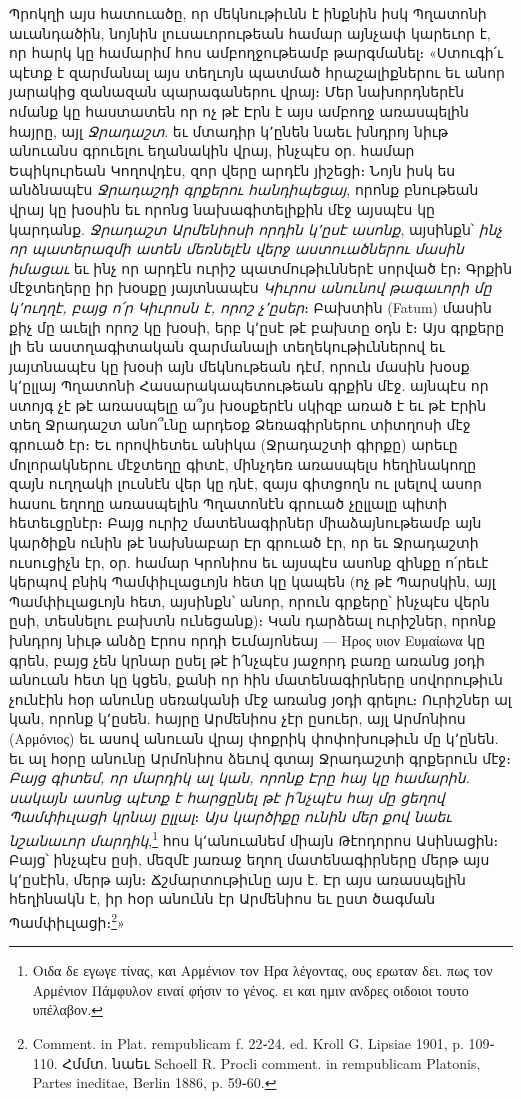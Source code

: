 \documentclass{article}
\begin{document}
{Պրոկղի այս հատուածը, որ մեկնութիւնն է ինքնին իսկ Պղատոնի աւանդածին, նոյնին լուսաւորութեան համար այնչափ կարեւոր է, որ հարկ կը համարիմ հոս ամբողջութեամբ թարգմանել։ «Ստուգի՛ւ պէտք է զարմանալ այս տեղւոյն պատմած հրաշալիքներու եւ անոր յարակից զանազան պարագաներու վրայ։ Մեր նախորդներէն ոմանք կը հաստատեն որ ոչ թէ Էրն է այս ամբողջ առասպելին հայրը, այլ \emph{Ջրադաշտ}. եւ մտադիր կ՚ընեն նաեւ խնդրոյ նիւթ անուանս գրուելու եղանակին վրայ, ինչպէս օր. համար Եպիկուրեան Կողովդէս, զոր վերը արդէն յիշեցի։ Նոյն իսկ ես անձնապէս \emph{Ջրադաշդի գրքերու հանդիպեցայ}, որոնք բնութեան վրայ կը խօսին եւ որոնց նախագիտելիքին մէջ այսպէս կը կարդանք. \emph{Ջրադաշտ Արմենիոսի որդին կ՚ըսէ ասոնք}, այսինքն՝ \emph{ինչ որ պատերազմի ատեն մեռնելէն վերջ աստուածներու մասին իմացաւ} եւ ինչ որ արդէն ուրիշ պատմութիւններէ սորված էր։ Գրքին մէջտեղերը իր խօսքը յայտնապէս \emph{Կիւրոս անունով թագաւորի մը կ՚ուղղէ, բայց ո՛ր Կիւրոսն է, որոշ չ՚ըսեր}։ Բախտին (Fatum) մասին քիչ մը աւելի որոշ կը խօսի, երբ կ՚ըսէ թէ բախտը օդն է։ Այս գրքերը լի են աստղագիտական զարմանալի տեղեկութիւններով եւ յայտնապէս կը խօսի այն մեկնութեան դէմ, որուն մասին խօսք կ՚ըլլայ Պղատոնի Հասարակապետութեան գրքին մէջ. այնպէս որ ստոյգ չէ թէ առասպելը ա՞յս խօսքերէն սկիզբ առած է եւ թէ Էրին տեղ Ջրադաշտ անո՞ւնը արդեօք Ձեռագիրներու տիտղոսի մէջ գրուած էր։ Եւ որովհետեւ անիկա (Ջրադաշտի գիրքը) արեւը մոլորակներու մէջտեղը գիտէ, մինչդեռ առասպելս հեղինակողը զայն ուղղակի լուսնէն վեր կը դնէ, զայս գիտցողն ու լսելով ասոր հասու եղողը առասպելին Պղատոնէն գրուած չըլլալը պիտի հետեւցընէր։ Բայց ուրիշ մատենագիրներ միաձայնութեամբ այն կարծիքն ունին թէ նախնաբար Էր գրուած էր, որ եւ Ջրադաշտի ուսուցիչն էր, օր. համար Կրոնիոս եւ այսպէս ասոնք զինքը ո՛րեւէ կերպով բնիկ Պամփիւլացւոյն հետ կը կապեն (ոչ թէ Պարսկին, այլ Պամփիւլացւոյն հետ, այսինքն՝ անոր, որուն գրքերը՝ ինչպէս վերն ըսի, տեսնելու բախտն ունեցանք)։ Կան դարձեալ ուրիշներ, որոնք խնդրոյ նիւթ անձը Էրոս որդի Եւմայոնեայ — Ηρος υιον Ευμαίωνα կը գրեն, բայց չեն կրնար ըսել թէ ի՛նչպէս յաջորդ բառը առանց յօդի անուան հետ կը կցեն, քանի որ հին մատենագիրները սովորութիւն չունէին հօր անունը սեռականի մէջ առանց յօդի գրելու։ Ուրիշներ ալ կան, որոնք կ՚ըսեն. հայրը Արմենիոս չէր ըսուեր, այլ Արմոնիոս (Αρμόνιος) եւ ասով անուան վրայ փոքրիկ փոփոխութիւն մը կ՚ընեն. եւ ալ հօրը անունը Արմոնիոս ձեւով գտայ Ջրադաշտի գրքերուն մէջ։ \emph{Բայց գիտեմ, որ մարդիկ ալ կան, որոնք Էրը հայ կը համարին. սակայն ասոնց պէտք է հարցընել թէ ի՛նչպէս հայ մը ցեղով Պամփիւլացի կրնայ ըլլալ}։ \emph{Այս կարծիքը ունին մեր քով նաեւ նշանաւոր մարդիկ},\footnote{Οιδα δε εγωγε τίνας, και Αρμένιον τον Ηρα λέγοντας, ους ερωταν δει. πως τον Αρμένιον Πάμφυλον ειναί φήσιν το γένος. ει και ημιν ανδρες οιδοιοι τουτο υπέλαβον.} հոս կ՚անուանեմ միայն Թէոդորոս Ասինացին։ Բայց՝ ինչպէս ըսի, մեզմէ յառաջ եղող մատենագիրները մերթ այս կ՚ըսէին, մերթ այն։ Ճշմարտութիւնը այս է. Էր այս առասպելին հեղինակն է, իր հօր անունն էր Արմենիոս եւ ըստ ծագման Պամփիւլացի։\footnote{Comment. in Plat. rempublicam f. 22֊24. ed. Kroll G. Lipsiae 1901, p. 109֊110. Հմմտ. նաեւ Schoell R. Procli comment. in rempublicam Platonis, Partes ineditae, Berlin 1886, p. 59֊60.}»

}
\end{document}
